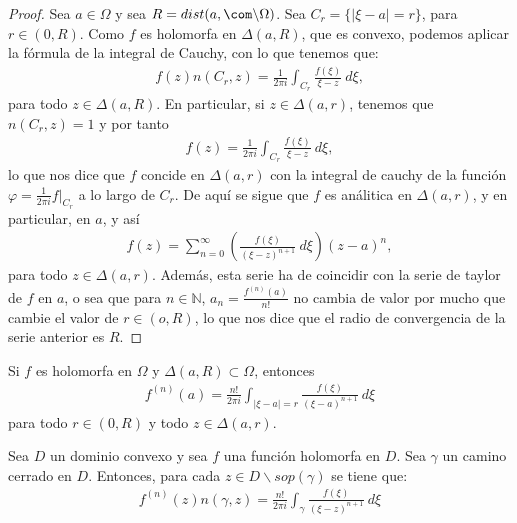 \begin{proof}
Sea $a \in \Omega$ y sea $R = dist(a, \com \backslash \Omega)$. Sea $C_r = \{ |\xi - a| = r \}$, para $r \in (0,R)$. Como $f$ es holomorfa en $\Delta(a,R)$, que es convexo, podemos aplicar la fórmula de la integral de Cauchy, con lo que tenemos que:
\begin{align*}
    f(z)n(C_r,z) = \frac{1}{2\pi i}\int_{C_r}{\frac{f(\xi)}{\xi - z} \ d\xi},
\end{align*}
para todo $z \in \Delta(a,R)$. En particular, si $z \in \Delta(a,r)$, tenemos que $n(C_r,z) = 1$ y por tanto
\begin{align*}
    f(z) = \frac{1}{2\pi i}\int_{C_r}{\frac{f(\xi)}{\xi - z} \ d\xi},
\end{align*}
lo que nos dice que $f$ concide en $\Delta(a,r)$ con la integral de cauchy de la función $\varphi = \frac{1}{2\pi i}f|_{C_r}$ a lo largo de $C_r$. De aquí se sigue que $f$ es análitica en $\Delta(a,r)$, y en particular, en $a$, y así
\begin{align*}
    f(z) = \sum_{n=0}^{\infty}\left( \frac{f(\xi)}{(\xi - z)^{n+1}} \ d\xi \right)(z-a)^n,
\end{align*}
para todo $z \in \Delta(a,r)$. Además, esta serie ha de coincidir con la serie de taylor de $f$ en $a$, o sea que para $n \in \mathbb{N}$, $a_n = \frac{f^{(n)}(a)}{n!}$ no cambia de valor por mucho que cambie el valor de $r \in (o,R)$, lo que nos dice que el radio de convergencia de la serie anterior es $R$.
\end{proof}

\begin{obs}
Si $f$ es holomorfa en $\Omega$ y $\Delta(a,R) \subset \Omega$, entonces
\begin{align*}
    f^{(n)}(a) = \frac{n!}{2\pi i} \int_{|\xi -a| = r} \frac{f(\xi)}{(\xi - a)^{n+1}} \ d\xi
\end{align*}
para todo $r \in (0,R)$ y todo $z \in \Delta(a,r)$.
\end{obs}

\begin{teo}
Sea $D$ un dominio convexo y sea $f$ una función holomorfa en $D$. Sea $\gamma$ un camino cerrado en $D$. Entonces, para cada $z \in D \backslash sop(\gamma)$ se tiene que:
\begin{align*}
    f^{(n)}(z)n(\gamma,z) = \frac{n!}{2\pi i} \int_{\gamma} \frac{f(\xi)}{(\xi - z)^{n+1}} \ d\xi
\end{align*}
\end{teo}

